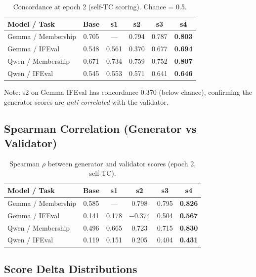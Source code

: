 \documentclass[11pt,a4paper]{article}
\begin{document}
\begin{table}[H]
\centering
\caption{Concordance at epoch 2 (self-TC scoring). Chance = 0.5.}
\label{tab:concordance}
\begin{tabular}{lccccc}
\toprule
\textbf{Model / Task} & \textbf{Base} & \textbf{s1} & \textbf{s2} & \textbf{s3} & \textbf{s4} \\
\midrule
Gemma / Membership & 0.705 & --- & 0.794 & 0.787 & \textbf{0.803} \\
Gemma / IFEval & 0.548 & 0.561 & 0.370 & 0.677 & \textbf{0.694} \\
Qwen / Membership & 0.671 & 0.734 & 0.759 & 0.752 & \textbf{0.807} \\
Qwen / IFEval & 0.545 & 0.553 & 0.571 & 0.641 & \textbf{0.646} \\
\bottomrule
\end{tabular}
\end{table}

Note: s2 on Gemma IFEval has concordance 0.370 (below chance), confirming the generator scores are \emph{anti-correlated} with the validator.

\subsection{Spearman Correlation (Generator vs Validator)}

\begin{table}[H]
\centering
\caption{Spearman $\rho$ between generator and validator scores (epoch 2, self-TC).}
\label{tab:spearman}
\begin{tabular}{lccccc}
\toprule
\textbf{Model / Task} & \textbf{Base} & \textbf{s1} & \textbf{s2} & \textbf{s3} & \textbf{s4} \\
\midrule
Gemma / Membership & 0.585 & --- & 0.798 & 0.795 & \textbf{0.826} \\
Gemma / IFEval & 0.141 & 0.178 & $-$0.374 & 0.504 & \textbf{0.567} \\
Qwen / Membership & 0.496 & 0.665 & 0.723 & 0.715 & \textbf{0.830} \\
Qwen / IFEval & 0.119 & 0.151 & 0.205 & 0.404 & \textbf{0.431} \\
\bottomrule
\end{tabular}
\end{table}

\subsection{Score Delta Distributions}
\end{document}
